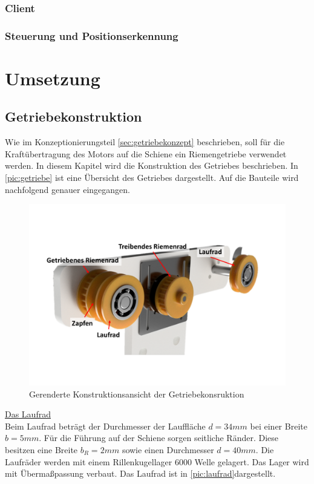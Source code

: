 \subsection{Client}
\subsection{Steuerung und Positionserkennung}

\chapter{Umsetzung}
\section{Getriebekonstruktion}
Wie im Konzeptionierungsteil \ref{sec:getriebekonzept} beschrieben, soll für die Kraftübertragung des Motors auf die Schiene ein Riemengetriebe verwendet werden. In diesem Kapitel wird die Konstruktion des Getriebes beschrieben. In \autoref{pic:getriebe} ist eine Übersicht des Getriebes dargestellt. Auf die Bauteile wird nachfolgend genauer eingegangen. 

\begin{figure}[h]
	\begin{center}
		\includegraphics[width=12cm]{getriebe.pdf}
		\caption{Gerenderte Konstruktionsansicht der Getriebekonsruktion}
		\label{pic:getriebe}
	\end{center}
\end{figure} 
\newpage


\underline{Das Laufrad}\\
Beim Laufrad beträgt der Durchmesser der Lauffläche $d=34mm$ bei einer Breite $b=5mm$. Für die Führung auf der Schiene sorgen seitliche Ränder. Diese besitzen eine Breite $b_R=2mm$ sowie einen Durchmesser $d=40mm$. Die Laufräder werden mit einem Rillenkugellager 6000 Welle gelagert. Das Lager wird mit Übermaßpassung verbaut. Das Laufrad ist in \autoref{pic:laufrad}dargestellt. \\

